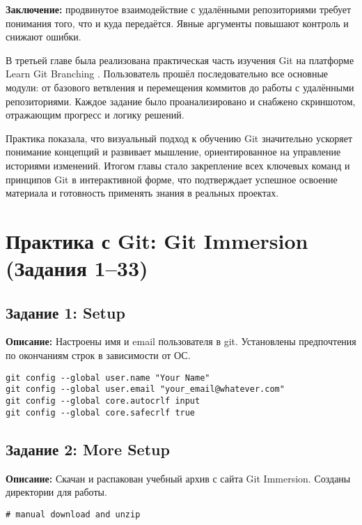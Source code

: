 \documentclass[a4paper,12pt]{report}
\begin{document}
\textbf{Заключение:} продвинутое взаимодействие с удалёнными репозиториями требует понимания того, что и куда передаётся. Явные аргументы повышают контроль и снижают ошибки.


В третьей главе была реализована практическая часть изучения Git на платформе Learn Git Branching \cite{learngitbranching}. Пользователь прошёл последовательно все основные модули: от базового ветвления и перемещения коммитов до работы с удалёнными репозиториями. Каждое задание было проанализировано и снабжено скриншотом, отражающим прогресс и логику решений.

Практика показала, что визуальный подход к обучению Git значительно ускоряет понимание концепций и развивает мышление, ориентированное на управление историями изменений. Итогом главы стало закрепление всех ключевых команд и принципов Git в интерактивной форме, что подтверждает успешное освоение материала и готовность применять знания в реальных проектах.



\chapter{Практика с Git: Git Immersion (Задания 1--33)}

\section*{Задание 1: Setup}
\textbf{Описание:} Настроены имя и email пользователя в git. Установлены предпочтения по окончаниям строк в зависимости от ОС.
\begin{verbatim}
git config --global user.name "Your Name"
git config --global user.email "your_email@whatever.com"
git config --global core.autocrlf input
git config --global core.safecrlf true
\end{verbatim}

\section*{Задание 2: More Setup}
\textbf{Описание:} Скачан и распакован учебный архив с сайта Git Immersion. Созданы директории для работы.
\begin{verbatim}
# manual download and unzip
\end{verbatim}
\end{document}
